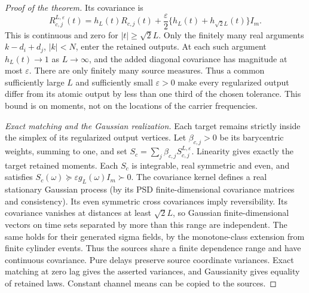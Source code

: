 \begin{proof}[Proof of the theorem]
Its covariance is
\[
 R_{c,j}^{L,\varepsilon}(t)
 =h_L(t)R_{c,j}(t)
 +\frac\varepsilon2\{h_L(t)+h_{\sqrt2L}(t)\}I_m.
\]
This is continuous and zero for $|t|\ge\sqrt2 L$.
Only the finitely many real arguments $k-d_i+d_j$, $|k|<N$, enter
the retained outputs. At each such argument $h_L(t)\to1$ as
$L\to\infty$, and the added diagonal covariance has magnitude at most
$\varepsilon$. There are only finitely many source measures. Thus a common sufficiently large
$L$ and sufficiently small $\varepsilon>0$ make every regularized output
differ from its atomic output by less than one third of the chosen tolerance.
This bound is on moments, not on the locations of the carrier frequencies.

\emph{Exact matching and the Gaussian realization.}
Each target remains strictly inside the simplex of its regularized
output vertices. Let $\beta_{c,j}>0$ be its barycentric weights, summing
to one, and set
$S_c=\sum_j\beta_{c,j}S_{c,j}^{L,\varepsilon}$.
Linearity gives exactly the target retained moments. Each $S_c$ is
integrable, real symmetric and even, and satisfies
$S_c(\omega)\succeq\varepsilon g_L(\omega)I_m\succ0$.
The covariance kernel defines a real stationary Gaussian process
(by its PSD finite-dimensional covariance matrices and consistency).
Its even symmetric cross covariances imply reversibility. Its covariance
vanishes at distances at least $\sqrt2 L$, so Gaussian finite-dimensional
vectors on time sets separated by more than this range are independent.
The same holds for their generated sigma fields, by the monotone-class
extension from finite cylinder events. Thus the sources share a finite
dependence range and have continuous covariance.
Pure delays preserve source coordinate variances. Exact matching at
zero lag gives the asserted variances, and Gaussianity gives equality
of retained laws. Constant channel means can be copied to the sources.
\end{proof}

